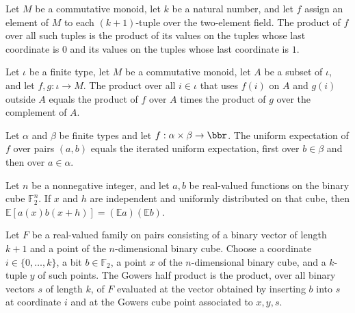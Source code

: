 \begin{theorem}
\leanok
{}
Let $M$ be a commutative monoid, let $k$ be a natural number, and let $f$ assign an
element of $M$ to each $(k+1)$-tuple over the two-element field. The product of $f$ over
all such tuples is the product of its values on the tuples whose last coordinate is $0$
and its values on the tuples whose last coordinate is $1$.
\end{theorem}

\begin{theorem}
\label{FABL.prod_ite_mem_compl}
\leanok
{}
Let $\iota$ be a finite type, let $M$ be a commutative monoid, let $A$ be a subset of
$\iota$, and let $f,g:\iota\to M$. The product over all $i\in\iota$ that uses $f(i)$ on
$A$ and $g(i)$ outside $A$ equals the product of $f$ over $A$ times the product of $g$
over the complement of $A$.
\end{theorem}

\begin{theorem}
\label{FABL.expect_prod_type}
\leanok
{}
Let $\alpha$ and $\beta$ be finite types and let $f:\alpha\times\beta\to\bbr$. The
uniform expectation of $f$ over pairs $(a,b)$ equals the iterated uniform expectation,
first over $b\in\beta$ and then over $a\in\alpha$.
\end{theorem}

\begin{theorem}
\label{FABL.expect_mul_add_eq_mul_expect}
\leanok
{}
Let $n$ be a nonnegative integer, and let $a,b$ be real-valued functions on the binary
cube $\mathbb F_2^n$. If $x$ and $h$ are independent and uniformly distributed on that
cube, then $\mathbb E[a(x)b(x+h)]=(\mathbb E a)(\mathbb E b)$.
\end{theorem}

\begin{definition}
\label{FABL.gowersHalfProductAt}
\leanok
{}
Let $F$ be a real-valued family on pairs consisting of a binary vector of length $k+1$
and a point of the $n$-dimensional binary cube. Choose a coordinate
$i\in\{0,\ldots,k\}$, a bit $b\in\mathbb{F}_2$, a point $x$ of the $n$-dimensional
binary cube, and a $k$-tuple $y$ of such points. The Gowers half product is the product,
over all binary vectors $s$ of length $k$, of $F$ evaluated at the vector obtained by
inserting $b$ into $s$ at coordinate $i$ and at the Gowers cube point associated to
$x,y,s$.
\end{definition}

